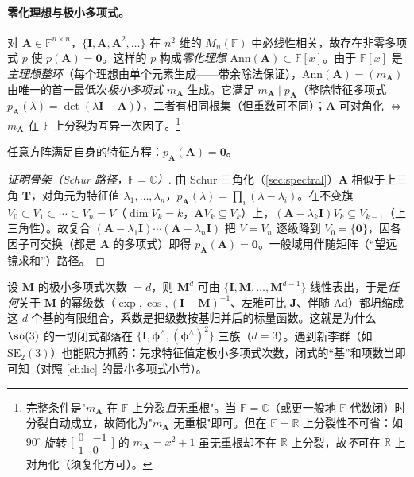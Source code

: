 \paragraph{零化理想与极小多项式。}
对 $\mathbf{A}\in\mathbb{F}^{n\times n}$，$\{\mathbf{I},\mathbf{A},\mathbf{A}^2,\dots\}$ 在 $n^2$ 维的 $M_n(\mathbb{F})$ 中必线性相关，故存在非零多项式 $p$ 使 $p(\mathbf{A})=\mathbf{0}$。这样的 $p$ 构成\emph{零化理想} $\mathrm{Ann}(\mathbf{A})\subset\mathbb{F}[x]$。由于 $\mathbb{F}[x]$ 是\emph{主理想整环}（每个理想由单个元素生成——带余除法保证），$\mathrm{Ann}(\mathbf{A})=(m_{\mathbf{A}})$ 由唯一的首一最低次\emph{极小多项式} $m_{\mathbf{A}}$ 生成。它满足 $m_{\mathbf{A}}\mid p_{\mathbf{A}}$（整除特征多项式 $p_{\mathbf{A}}(\lambda)=\det(\lambda\mathbf{I}-\mathbf{A})$），二者有相同根集（但重数可不同）；$\mathbf{A}$ 可对角化 $\iff$ $m_{\mathbf{A}}$ 在 $\mathbb{F}$ 上分裂为互异一次因子。\footnote{完整条件是"$m_{\mathbf{A}}$ 在 $\mathbb{F}$ 上分裂\emph{且}无重根"。当 $\mathbb{F}=\mathbb{C}$（或更一般地 $\mathbb{F}$ 代数闭）时分裂自动成立，故简化为"$m_{\mathbf{A}}$ 无重根"即可。但在 $\mathbb{F}=\mathbb{R}$ 上分裂性不可省：如 $90^\circ$ 旋转 $\bigl[\begin{smallmatrix}0&-1\\1&0\end{smallmatrix}\bigr]$ 的 $m_{\mathbf{A}}=x^2+1$ 虽无重根却不在 $\mathbb{R}$ 上分裂，故\emph{不}可在 $\mathbb{R}$ 上对角化（须复化方可）。}

\begin{theorem}\label{thm:cayley-hamilton}
任意方阵满足自身的特征方程：$p_{\mathbf{A}}(\mathbf{A})=\mathbf{0}$。
\end{theorem}
\begin{proof}[证明骨架（Schur 路径，$\mathbb{F}=\mathbb{C}$）]
由 Schur 三角化（\cref{sec:spectral}）$\mathbf{A}$ 相似于上三角 $\mathbf{T}$，对角元为特征值 $\lambda_1,\dots,\lambda_n$，$p_{\mathbf{A}}(\lambda)=\prod_i(\lambda-\lambda_i)$。在不变旗 $V_0\subset V_1\subset\cdots\subset V_n=V$（$\dim V_k=k$，$\mathbf{A}V_k\subseteq V_k$）上，$(\mathbf{A}-\lambda_k\mathbf{I})V_k\subseteq V_{k-1}$（上三角性）。故复合 $(\mathbf{A}-\lambda_1\mathbf{I})\cdots(\mathbf{A}-\lambda_n\mathbf{I})$ 把 $V=V_n$ 逐级降到 $V_0=\{\mathbf{0}\}$，因各因子可交换（都是 $\mathbf{A}$ 的多项式）即得 $p_{\mathbf{A}}(\mathbf{A})=\mathbf{0}$。一般域用伴随矩阵（“望远镜求和”）路径。
\end{proof}

\begin{insight}
设 $\mathbf{M}$ 的极小多项式次数 $=d$，则 $\mathbf{M}^d$ 可由 $\{\mathbf{I},\mathbf{M},\dots,\mathbf{M}^{d-1}\}$ 线性表出，于是\emph{任何}关于 $\mathbf{M}$ 的幂级数（$\exp,\cos,(\mathbf{I}-\mathbf{M})^{-1}$、左雅可比 $\mathbf{J}$、伴随 $\mathrm{Ad}$）都坍缩成这 $d$ 个基的有限组合，系数是把级数按基归并后的标量函数。这就是为什么 $\so(3)$ 的一切闭式都落在 $\{\mathbf{I},\boldsymbol{\phi}^\wedge,(\boldsymbol{\phi}^\wedge)^2\}$ 三族（$d=3$）。遇到新李群（如 $\mathrm{SE}_2(3)$）也能照方抓药：先求特征值定极小多项式次数，闭式的“基”和项数当即可知（对照 \cref{ch:lie} 的最小多项式小节）。
\end{insight}

